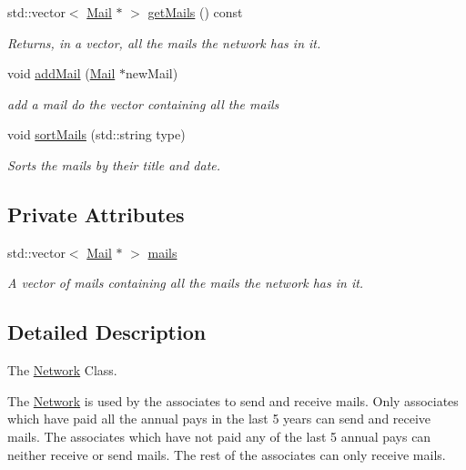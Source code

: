\begin{DoxyCompactItemize}
std\+::vector$<$ \mbox{\hyperlink{classMail}{Mail}} $\ast$ $>$ \mbox{\hyperlink{classNetwork_acd375ea0a8fb7558f15a432ce6354d93}{get\+Mails}} () const
\begin{DoxyCompactList}\small\item\em Returns, in a vector, all the mails the network has in it. \end{DoxyCompactList}\item 
void \mbox{\hyperlink{classNetwork_a848afdda14081f142404050833050d4b}{add\+Mail}} (\mbox{\hyperlink{classMail}{Mail}} $\ast$new\+Mail)
\begin{DoxyCompactList}\small\item\em add a mail do the vector containing all the mails \end{DoxyCompactList}\item 
void \mbox{\hyperlink{classNetwork_ab7eb46f37b172f7e7281ad5d27cb0ba0}{sort\+Mails}} (std\+::string type)
\begin{DoxyCompactList}\small\item\em Sorts the mails by their title and date. \end{DoxyCompactList}\end{DoxyCompactItemize}
\subsection*{Private Attributes}
\begin{DoxyCompactItemize}
\item 
std\+::vector$<$ \mbox{\hyperlink{classMail}{Mail}} $\ast$ $>$ \mbox{\hyperlink{classNetwork_a7d870918668129e7853c5374785955b1}{mails}}
\begin{DoxyCompactList}\small\item\em A vector of mails containing all the mails the network has in it. \end{DoxyCompactList}\end{DoxyCompactItemize}


\subsection{Detailed Description}
The \mbox{\hyperlink{classNetwork}{Network}} Class. 

The \mbox{\hyperlink{classNetwork}{Network}} is used by the associates to send and receive mails. Only associates which have paid all the annual pays in the last 5 years can send and receive mails. The associates which have not paid any of the last 5 annual pays can neither receive or send mails. The rest of the associates can only receive mails. 


